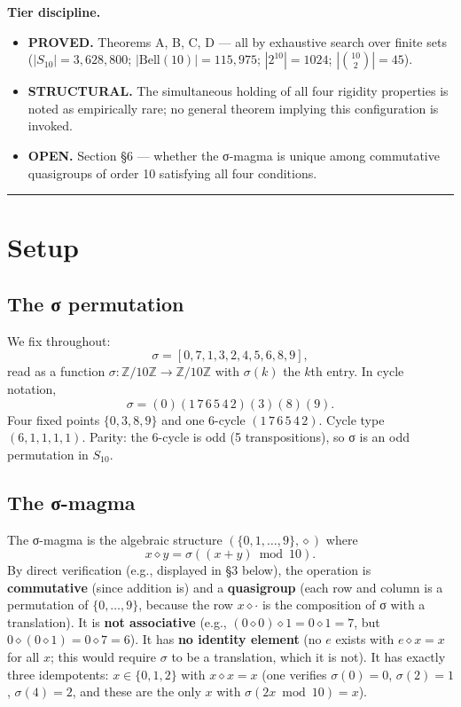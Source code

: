 \documentclass[11pt,reqno]{amsart}
\theoremstyle{plain}
\theoremstyle{definition}
\begin{document}
\textbf{Tier discipline.}
\begin{itemize}
\item \textbf{PROVED.} Theorems A, B, C, D --- all by exhaustive search over finite sets ($|S_{10}| = 3{,}628{,}800$; $|\mathrm{Bell}(10)| = 115{,}975$; $|2^{10}| = 1024$; $|\binom{10}{2}| = 45$).
\item \textbf{STRUCTURAL.} The simultaneous holding of all four rigidity properties is noted as empirically rare; no general theorem implying this configuration is invoked.
\item \textbf{OPEN.} Section §6 --- whether the σ-magma is unique among commutative quasigroups of order 10 satisfying all four conditions.
\end{itemize}

\medskip\hrule\medskip

\section{Setup}

\subsection{The σ permutation}

We fix throughout:
$$
\sigma = [0, 7, 1, 3, 2, 4, 5, 6, 8, 9],
$$
read as a function $\sigma : \mathbb{Z}/10\mathbb{Z} \to \mathbb{Z}/10\mathbb{Z}$ with $\sigma(k)$ the $k$th entry. In cycle notation,
$$
\sigma = (0)(1\,7\,6\,5\,4\,2)(3)(8)(9).
$$
Four fixed points $\{0, 3, 8, 9\}$ and one 6-cycle $(1\,7\,6\,5\,4\,2)$. Cycle type $(6, 1, 1, 1, 1)$. Parity: the 6-cycle is odd (5 transpositions), so σ is an odd permutation in $S_{10}$.

\subsection{The σ-magma}

The σ-magma is the algebraic structure $(\{0, 1, \ldots, 9\}, \diamond)$ where
$$
x \diamond y = \sigma((x + y) \bmod 10).
$$
By direct verification (e.g., displayed in §3 below), the operation is \textbf{commutative} (since addition is) and a \textbf{quasigroup} (each row and column is a permutation of $\{0, \ldots, 9\}$, because the row $x \diamond \cdot$ is the composition of σ with a translation). It is \textbf{not associative} (e.g., $(0 \diamond 0) \diamond 1 = 0 \diamond 1 = 7$, but $0 \diamond (0 \diamond 1) = 0 \diamond 7 = 6$). It has \textbf{no identity element} (no $e$ exists with $e \diamond x = x$ for all $x$; this would require $\sigma$ to be a translation, which it is not). It has exactly three idempotents: $x \in \{0, 1, 2\}$ with $x \diamond x = x$ (one verifies $\sigma(0) = 0$, $\sigma(2) = 1$, $\sigma(4) = 2$, and these are the only $x$ with $\sigma(2x \bmod 10) = x$).
\end{document}
